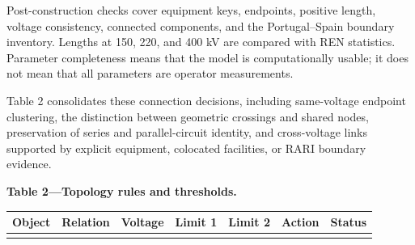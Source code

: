 \documentclass[
  10pt]{article}
\begin{document}
Post-construction checks cover equipment keys, endpoints, positive
length, voltage consistency, connected components, and the
Portugal--Spain boundary inventory. Lengths at 150, 220, and 400 kV are
compared with REN statistics. Parameter completeness means that the
model is computationally usable; it does not mean that all parameters
are operator measurements.

Table 2 consolidates these connection decisions, including same-voltage
endpoint clustering, the distinction between geometric crossings and
shared nodes, preservation of series and parallel-circuit identity, and
cross-voltage links supported by explicit equipment, colocated
facilities, or RARI boundary evidence.

\textbf{Table 2---Topology rules and thresholds.}

\begin{longtable}[]{@{}
  >{\raggedright\arraybackslash}p{}
  >{\raggedright\arraybackslash}p{}
  >{\raggedright\arraybackslash}p{}
  >{\raggedright\arraybackslash}p{}
  >{\raggedright\arraybackslash}p{}
  >{\raggedright\arraybackslash}p{}
  >{\raggedright\arraybackslash}p{}@{}}
\toprule\noalign{}
\begin{minipage}[b]{\linewidth}\raggedright
Object
\end{minipage} & \begin{minipage}[b]{\linewidth}\raggedright
Relation
\end{minipage} & \begin{minipage}[b]{\linewidth}\raggedright
Voltage
\end{minipage} & \begin{minipage}[b]{\linewidth}\raggedright
Limit 1
\end{minipage} & \begin{minipage}[b]{\linewidth}\raggedright
Limit 2
\end{minipage} & \begin{minipage}[b]{\linewidth}\raggedright
Action
\end{minipage} & \begin{minipage}[b]{\linewidth}\raggedright
Status
\end{minipage} \\
\midrule\noalign{}
\endhead

\end{longtable}
\end{document}
